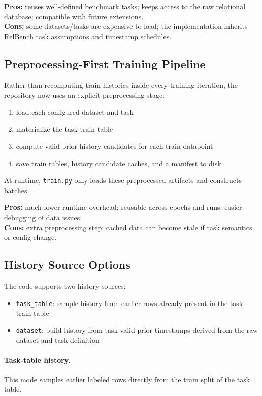 \documentclass[11pt]{article}
\begin{document}
\textbf{Pros:} reuses well-defined benchmark tasks; keeps access to the raw relational database; compatible with future extensions.\\
\textbf{Cons:} some datasets/tasks are expensive to load; the implementation inherits RelBench task assumptions and timestamp schedules.

\subsection{Preprocessing-First Training Pipeline}

Rather than recomputing train histories inside every training iteration, the repository now uses an explicit preprocessing stage:
\begin{enumerate}
\item load each configured dataset and task
\item materialize the task train table
\item compute valid prior history candidates for each train datapoint
\item save train tables, history candidate caches, and a manifest to disk
\end{enumerate}

At runtime, \texttt{train.py} only loads these preprocessed artifacts and constructs batches.

\textbf{Pros:} much lower runtime overhead; reusable across epochs and runs; easier debugging of data issues.\\
\textbf{Cons:} extra preprocessing step; cached data can become stale if task semantics or config change.

\subsection{History Source Options}

The code supports two history sources:
\begin{itemize}
\item \texttt{task\_table}: sample history from earlier rows already present in the task train table
\item \texttt{dataset}: build history from task-valid prior timestamps derived from the raw dataset and task definition
\end{itemize}

\paragraph{Task-table history.}
This mode samples earlier labeled rows directly from the train split of the task table.
\end{document}
